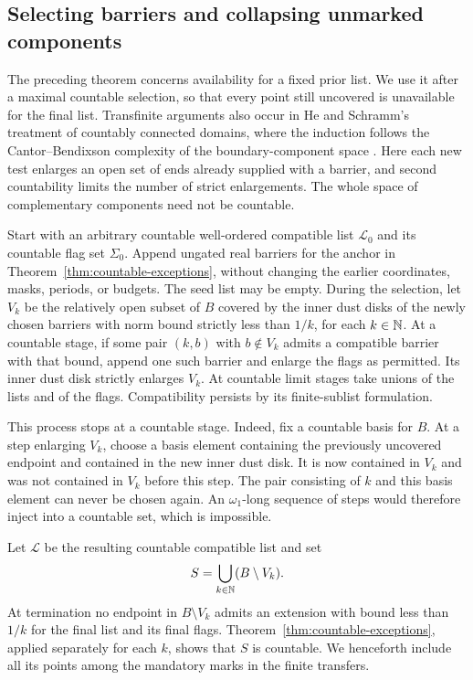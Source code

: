 \subsection{Selecting barriers and collapsing unmarked components}

The preceding theorem concerns availability for a fixed prior list.
We use it after a maximal countable selection, so that every point still
uncovered is unavailable for the final list.  Transfinite arguments
also occur in He and Schramm's treatment of countably connected
domains, where the induction follows the Cantor--Bendixson complexity
of the boundary-component space
\cite[p.~373 and Theorem~7.1]{HeSchramm1993}.  Here each new test
enlarges an open set of ends already supplied with a barrier, and
second countability limits the number of strict enlargements.
The whole space of complementary components need not be countable.

Start with an arbitrary countable well-ordered compatible list
$\mathscr L_0$ and its countable flag set $\Sigma_0$.  Append
ungated real barriers for the anchor in
Theorem~\ref{thm:countable-exceptions}, without changing the earlier
coordinates, masks, periods, or budgets.  The seed list may be empty.
During the selection,
let $V_k$ be the relatively open subset of $B$ covered by the inner dust
disks of the newly chosen barriers with norm bound strictly less than
$1/k$, for each $k\in\mathbb N$.  At a countable stage, if some pair $(k,b)$
with $b\notin V_k$ admits a compatible barrier with that bound, append
one such barrier and enlarge the flags as permitted.  Its inner dust
disk strictly enlarges $V_k$.
At countable limit stages take unions of the lists and of the flags.
Compatibility persists by its finite-sublist formulation.

This process stops at a countable stage.  Indeed, fix a countable basis
for $B$.  At a step enlarging $V_k$, choose a basis element containing
the previously uncovered endpoint and contained in the new inner dust
disk.  It is now contained in $V_k$ and was not contained in $V_k$
before this step.  The pair consisting of $k$ and this basis element
can never be chosen again.  An $\omega_1$-long sequence of steps would
therefore inject into a countable set, which is impossible.

Let $\mathscr L$ be the resulting countable compatible list and set
\begin{equation}
 \label{eq:first-exceptional-set}
 S=\bigcup_{k\in\mathbb N}(B\setminus V_k).
\end{equation}
At termination no endpoint in $B\setminus V_k$ admits an extension
with bound less than $1/k$ for the final list and its final flags.
Theorem~\ref{thm:countable-exceptions}, applied separately for each $k$,
shows that $S$ is countable.  We henceforth include all its points among
the mandatory marks in the finite transfers.

